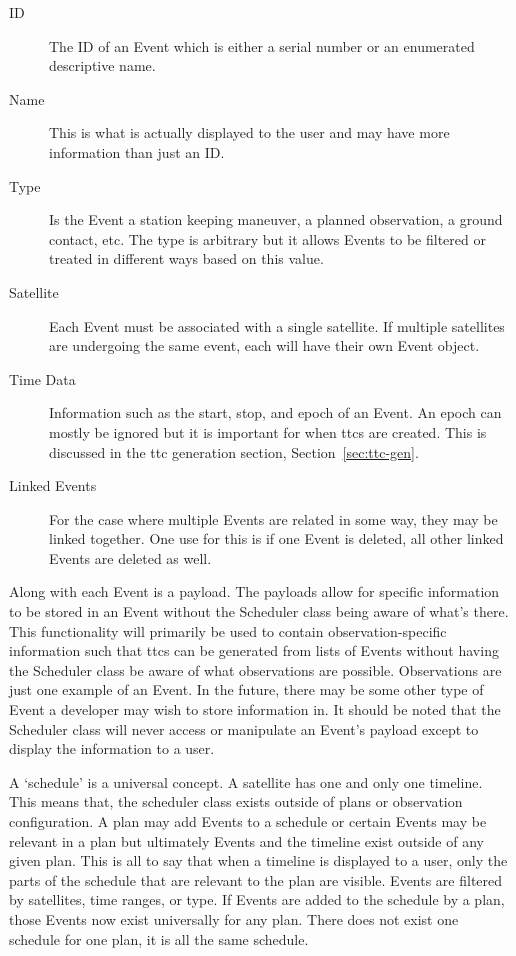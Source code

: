 \begin{description} 

    \item[ID] The ID of an Event which is either a serial number or an
	enumerated descriptive name.

    \item[Name] This is what is actually displayed to the user and may have
	more information than just an ID.

    \item[Type] Is the Event a station keeping maneuver, a planned observation,
	a ground contact, etc. The type is arbitrary but it allows Events to be
	filtered or treated in different ways based on this value.

    \item[Satellite] Each Event must be associated with a single satellite. If
	multiple satellites are undergoing the same event, each will have their
	own Event object.

    \item[Time Data] Information such as the start, stop, and epoch of an
	Event. An epoch can mostly be ignored but it is important for when
	\glspl{ttc} are created. This is discussed in the \gls{ttc} generation
	section, Section~\ref{sec:ttc-gen}.

    \item[Linked Events] For the case where multiple Events are related in some
	way, they may be linked together. One use for this is if one Event is
	deleted, all other linked Events are deleted as well.

\end{description} 

Along with each Event is a payload. The payloads allow for specific information
to be stored in an Event without the Scheduler class being aware of what's
there. This functionality will primarily be used to contain observation-specific
information such that \glspl{ttc} can be generated from lists of Events without
having the Scheduler class be aware of what observations are possible.
Observations are just one example of an Event. In the future, there may be some
other type of Event a developer may wish to store information in.  It should be
noted that the Scheduler class will never access or manipulate an Event's
payload except to display the information to a user.

A `schedule' is a universal concept. A satellite has one and only one timeline.
This means that, the scheduler class exists outside of plans or observation
configuration. A plan may add Events to a schedule or certain Events may be
relevant in a plan but ultimately Events and the timeline exist outside of any
given plan. This is all to say that when a timeline is displayed to a user,
only the parts of the schedule that are relevant to the plan are visible.
Events are filtered by satellites, time ranges, or type. If Events are added to
the schedule by a plan, those Events now exist universally for any plan. There
does not exist one schedule for one plan, it is all the same schedule.

